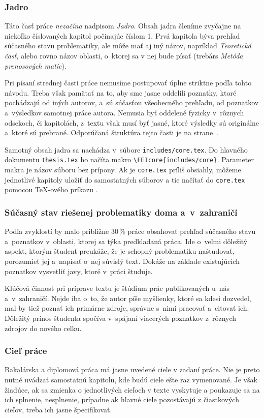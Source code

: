 \subsubsection{Jadro}
Táto časť práce \emph{nezačína} nadpisom \emph{Jadro}.
Obsah jadra členíme zvyčajne na niekoľko číslovaných
kapitol počínajúc číslom 1.
Prvá kapitola býva prehľad súčasného stavu problematiky,
ale môže mať aj iný názov,
napríklad \emph{Teoretická časť,} alebo rovno názov oblasti,
o~ktorej sa v nej bude písať
(trebárs \emph{Metóda prenosových matíc}).

Pri písaní strednej časti práce nemusíme postupovať úplne
striktne podľa tohto návodu.
Treba však pamätať na to,
aby sme jasne oddelili poznatky,
ktoré pochádzajú od iných autorov,
a~sú súčasťou všeobecného prehľadu,
od poznatkov a~výsledkov samotnej práce autora.
Nemusia byť oddelené fyzicky v~rôznych odsekoch,
či kapitolách, z~textu však musí byť jasné,
ktoré výsledky sú originálne a~ktoré sú prebrané.
Odporúčaná štruktúra tejto časti je na
strane~\pageref{sec:StrukturaPrace}.

Samotný obsah jadra sa nachádza v~súbore \verb|includes/core.tex|.
Do hlavného dokumentu \verb|thesis.tex| ho načíta makro \verb|\FEIcore{includes/core}|.
Parameter makra je názov súboru bez prípony.
Ak je \verb|core.tex| príliš obsiahly,
môžeme jednotlivé kapitoly uložiť do samostatných
súborov a tie načítať do \verb|core.tex|
pomocou \TeX-ového príkazu \verb||.

\subsubsection*{\normalsize Súčasný stav riešenej problematiky
doma a~v~zahraničí}
Podľa zvyklostí by malo približne 30\,\% práce obsahovať prehľad
súčasného stavu a~poznatkov v~oblasti,
ktorej sa týka predkladaná práca.
Ide o~veľmi dôležitý aspekt,
ktorým študent preukáže,
že je schopný problematiku naštudovať,
porozumieť jej a~napísať o~nej súvislý text.
Dokáže na základe existujúcich poznatkov vysvetliť javy,
ktoré v~práci študuje.

Kľúčová činnosť pri príprave textu je štúdium prác publikovaných
u~nás a~v~zahraničí.
Nejde iba o~to, že autor píše myšlienky, ktoré sa kdesi dozvedel,
mal by tiež poznať ich primárne zdroje,
správne s~nimi pracovať a~citovať ich.
Dôležitý prínos študenta spočíva v~spájaní viacerých poznatkov
z~rôznych zdrojov do nového celku.

\subsubsection*{\normalsize Cieľ práce}
Bakalárska a diplomová práca má jasne uvedené ciele v zadaní práce. Nie je preto nutné uvádzať samostatnú kapitolu, kde budú ciele ešte raz vymenované. Je však žiadúce, ak sa zmienka o jednotlivých cieľoch v texte vyskytuje a poukazuje sa na ich splnenie, nesplnenie, prípadne ak hlavné ciele pozostávajú z čiastkových cieľov, treba ich jasne špecifikovať.

